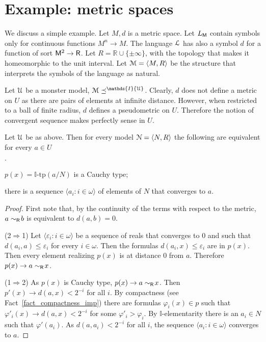 \documentclass[10pt,oneside]{amsproc}
\newcommand{\mylabel}[1]{{#1}\hfill}
\renewenvironment{itemize}
  {\begin{list}{$\cdot$}{%
  \setlength{\parskip}{0mm}
  \setlength{\topsep}{.2\baselineskip}
  \setlength{\rightmargin}{0mm}
  \setlength{\listparindent}{0mm}
  \setlength{\itemindent}{0mm}
  \setlength{\labelwidth}{3ex}
  \setlength{\itemsep}{.2\baselineskip}
  \setlength{\parsep}{.2\baselineskip}
  \setlength{\partopsep}{0mm}
  \setlength{\labelsep}{1ex}
  \setlength{\leftmargin}{\labelwidth+\labelsep}
  \let\makelabel\mylabel}}{%
\end{list}}
\begin{document}
\section{Example: metric spaces}

We discuss a simple example.
Let $M,d$ is a metric space.
Let $L_{\sf M}$ contain symbols only for continuous functions $M^n\to M$.
The language ${\EuScript L}$ has also a symbol $d$ for a function of sort ${\sf M}^2\to {\sf R}$.
Let $R=\mathds{R}\cup\{\pm\infty\}$, with the topology that makes it homeomorphic to the unit interval.
Let ${\EuScript M}=\langle M,R\rangle$ be the structure that interprets the symbols of the language as natural.

Let ${\EuScript U}$ be a monster model, ${\EuScript M}\preceq^\mathds{I}{\EuScript U}$.
Clearly, $d$ does not define a metric on $U$ as there are pairs of elements at infinite distance.
However, when restricted to a ball of finite radius, $d$ defines a pseudometric on  $U$.
Therefore the notion of convergent sequence makes perfectly sense in $U$.

\begin{fact}
  Let $ {\EuScript U}$ be as above.
  Then for every model ${\EuScript N}=\langle N,R\rangle$ the following are equivalent for every $a\in U$
  \begin{itemize}
    \item[1.] $p(x)=\mathds{I}\mbox{-tp}(a/N)$ is a Cauchy type;
    \item[2.] there is a sequence $\langle a_i: i\in\omega\rangle$ of elements of $N$ that converges to $a$.
  \end{itemize} 
\end{fact}

\begin{proof}
  First note that, by the continuity of the terms with respect to the metric, $a\sim_{\sf R}\!b$ is equivalent to $d(a,b)=0$.

  (2$\Rightarrow$1) 
  Let $\langle \varepsilon_i: i\in\omega\rangle$ be a sequence of reals that converges to $0$ and such that $d(a_i,a)\le\varepsilon_i$ for every $i\in\omega$.
  Then the formulas $d(a_i,x)\le\varepsilon_i$ are in $p(x)$.
  Then every element realizing $p(x)$ is at distance $0$ from $a$.
  Therefore  $p(x)\rightarrow a\sim_{\sf R}\!x$.


  (1$\Rightarrow$2) 
  As $p(x)$ is Cauchy type, $p(x)\rightarrow a\sim_{\sf R}\!x$.
  Then $p'(x)\rightarrow d(a,x)<2^{-i}$ for all $i$.
  By compactness (see Fact~\ref{fact_compactness_imp}) there are formulas $\varphi_i(x)\in p$ such that $\varphi'_i(x)\rightarrow d(a,x)<2^{-i}$ for some $\varphi'_i>\varphi_i$.
  By $\mathds{I}$-elementarity there is an $a_i\in N$ such that $\varphi'(a_i)$.
  As $d(a,a_i)<2^{-i}$ for all $i$, the sequence $\langle a_i: i\in\omega\rangle$ converges to $a$.
\end{proof}
\end{document}

